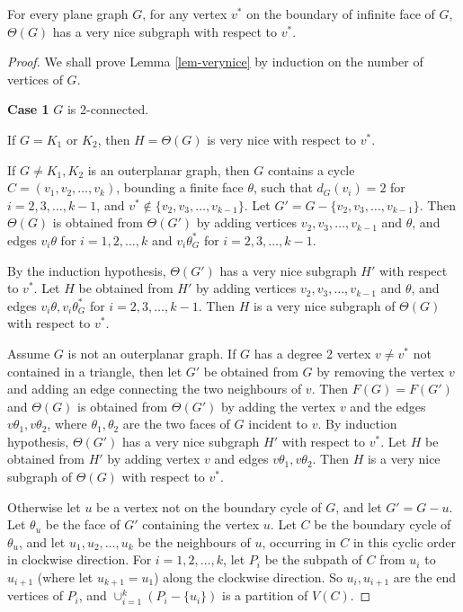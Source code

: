 \documentclass[10pt,a4paper]{amsart}
\begin{document}
\begin{lem}
    \label{lem-verynice}
    For every  plane graph $G$, for any vertex $v^*$ on the boundary of infinite face of $G$, $\Theta(G)$ has a very nice subgraph with respect to $v^*$.
\end{lem}

\begin{proof}
   We shall prove Lemma \ref{lem-verynice} by induction on the number of vertices of $G$. 
   

   \medskip
   \noindent
   {\bf Case 1} $G$ is 2-connected.
   \medskip
   
   If $G=K_1$ or $K_2$, then $H=\Theta(G)$ is very nice with respect to $v^*$. 
   
   If $G \ne K_1, K_2$ is an outerplanar graph, then $G$ contains a cycle $C=(v_1,v_2,\ldots, v_k)$, bounding a finite face $\theta$,  such that $d_G(v_i)=2$ for $i=2,3,\ldots, k-1$, and $v^* \notin \{v_2, v_3, \ldots, v_{k-1}\}$. Let $G'=G-\{v_2, v_3, \ldots, v_{k-1}\}$. Then $\Theta(G)$ is obtained from $\Theta(G')$ by adding vertices $v_2,v_3, \ldots, v_{k-1}$ and $\theta$, and edges $v_i \theta$ for $i=1, 2, \ldots, k$ and $v_i \theta^*_G$ for $i=2,3,\ldots, k-1$. 
   
   By the induction hypothesis, $\Theta(G')$ has a very nice subgraph $H'$  with respect to $v^*$. Let $H$ be obtained from $H'$ by adding vertices $v_2,v_3, \ldots, v_{k-1}$ and $\theta$, and edges $v_i \theta, v_i \theta^*_G$   for $i=2,3,\ldots, k-1$.  Then $H$ is a very nice subgraph of $\Theta(G)$ with respect to $v^*$. 



   Assume $G$ is not an outerplanar graph. 
   If $G$ has a degree 2 vertex $v \ne v^*$ not contained in a triangle, then let $G'$ be obtained from $G$ by removing the vertex $v$ and adding an edge connecting the two neighbours of $v$. Then $F(G)=F(G')$ and $\Theta(G)$ is obtained from $\Theta(G') $ by adding the vertex $v$ and the edges $v \theta_1, v \theta_2$, where $\theta_1,\theta_2$ are the two faces of $G$ incident to $v$. By induction hypothesis, $\Theta(G')$ has a very nice subgraph $H'$ with respect to $v^*$. Let $H$ be obtained from $H'$ by adding vertex $v$ and edges $v \theta_1, v \theta_2$. Then $H$ is a very nice subgraph of $\Theta(G)$ with respect to $v^*$.
 
Otherwise let $u$ be a vertex not on the boundary cycle of $G$, and let $G'=G-u$. Let $\theta_u$ be the face of $G'$ containing the vertex $u$. 
Let $C$ be the boundary cycle of $\theta_u$, and let 
 $u_1,u_2,\ldots, u_k$ be the neighbours of $u$, occurring in $C$ in this cyclic order in clockwise direction.  For $i=1,2,\ldots, k$, let $P_i$ be the subpath of $C$ from $u_i$ to $u_{i+1}$ (where let $u_{k+1}=u_1$) along the clockwise direction. So $u_i,u_{i+1}$ are the end vertices of $P_i$, and $\cup_{i=1}^k(P_i-\{u_i\})$ is a partition of $V(C)$. 
    

\end{proof}
\end{document}
